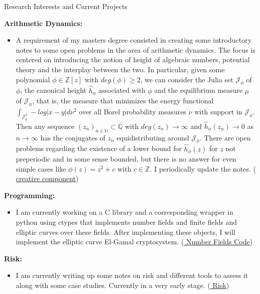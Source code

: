 \documentclass{resume} %
\newcommand{\N}{\mathbb{N}}
\newcommand{\Z}{\mathbb{Z}}
\newcommand{\Q}{\mathbb{Q}}
\newcommand{\MJ}{\mathcal{J}}
\begin{document}
\begin{rSection}{Research Interests and Current Projects}

{\bf Arithmetic Dynamics:}  
\begin{itemize}
\item A requirement of my masters degree consisted in creating some introductory notes to some open problems in the area of arithmetic dynamics. The focus is centered on introducing the notion of height of algebraic numbers,  potential theory and the interplay between the two. In particular, given some polynomial $\phi \in \Z[z]$ with $deg(\phi) \geq 2$, we can consider the Julia set $\MJ_{\phi}$ of $\phi$, the canonical height $\hat{h}_\phi$ associated with $\phi$ and the equilibrium measure $\mu$ of $\MJ_{\phi}$, that is, the measure that minimizes the energy functional $\int_{\MJ_{\phi}^2}-log|x-y|d\nu^2$ over all Borel probability measures $\nu$ with support in $\MJ_{\phi}$. Then any sequence $(z_n)_{n \in \N} \subset \overline{\Q}$ with $deg(z_n) \rightarrow \infty$ and $\hat{h}_{\phi}(z_n) \rightarrow 0$ as $n \rightarrow \infty$ has the conjugates of $z_n$ equidistributing around $\MJ_\phi$. There are open problems regarding the existence of a lower bound for $\hat{h}_{\phi}(z)$ for $z$ not preperiodic and in some sense bounded, but there is no answer for even simple cases like $\phi(z) = z^2+c$ with $c \in \Z$. I periodically update the notes. (\href{https://github.com/carsonaj/Math/blob/master/Arithmetic%20Dynamics/Arithmetic%20Dynamics%20Notes.pdf}{{\color{blue} creative component}})
\end{itemize}

{\bf Programming:}
\begin{itemize}
\item I am currently working on a C library and a corresponding wrapper in python using ctypes that implements number fields and finite fields and elliptic curves over these fields. After implementing these objects, I will implement the elliptic curve El-Gamal cryptosystem.  (\href{https://github.com/carsonaj/ccalc}{{\color{blue} Number Fields Code}})
\end{itemize}

{\bf Risk:}
\begin{itemize}
	\item I am currently writing up some notes on risk and different tools to assess it along with some case studies. Currently in a very early stage. (\href{https://github.com/carsonaj/Math/blob/master/Portfolio%20Theory/Portfolio%20Theory%20Notes.pdf}{{\color{blue} Risk}})
\end{itemize}


\end{rSection}
\end{document}
